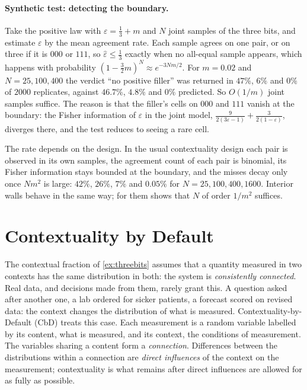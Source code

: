 \documentclass[11pt]{article}
\theoremstyle{definition}
\theoremstyle{remark}
\begin{document}
\paragraph{Synthetic test: detecting the boundary.} Take the positive law with $\varepsilon=\frac13+m$ and $N$ joint samples of the three bits,
and estimate $\varepsilon$ by the mean agreement rate. Each sample agrees on one pair, or on three if it is $000$ or $111$, so $\hat\varepsilon\le\frac13$
exactly when no all-equal sample appears, which happens with probability $(1-\frac32m)^N\approx e^{-3Nm/2}$. For $m=0.02$ and $N=25,100,400$ the
verdict ``no positive filler'' was returned in $47\%$, $6\%$ and $0\%$ of $2000$ replicates, against $46.7\%$, $4.8\%$ and $0\%$ predicted. So
$O(1/m)$ joint samples suffice. The reason is that the filler's cells on $000$ and $111$ vanish at the boundary: the Fisher information of
$\varepsilon$ in the joint model, $\frac9{2(3\varepsilon-1)}+\frac3{2(1-\varepsilon)}$, diverges there, and the test reduces to seeing a rare cell.

The rate depends on the design. In the usual contextuality design each pair is observed in its own samples, the agreement count of each
pair is binomial, its Fisher information stays bounded at the boundary, and the misses decay only once $Nm^2$ is large: $42\%$, $26\%$, $7\%$
and $0.05\%$ for $N=25,100,400,1600$. Interior walls behave in the same way; for them \cite[Prop.~12.2]{Conditionals} shows that $N$ of order
$1/m^2$ suffices.

\section{Contextuality by Default}\label{sec:cbd}

The contextual fraction of \cref{ex:threebits} assumes that a quantity measured in two contexts has the same distribution in both:
the system is \emph{consistently connected}. Real data, and decisions made from them, rarely grant this. A question asked after another
one, a lab ordered for sicker patients, a forecast scored on revised data: the context changes the distribution of what is measured.
Contextuality-by-Default (CbD) \cite{DzhafarovKujala2016} treats this case. Each measurement is a random variable labelled by its content,
what is measured, and its context, the conditions of measurement. The variables sharing a content form a \emph{connection}. Differences between
the distributions within a connection are \emph{direct influences} of the context on the measurement; contextuality is what remains after
direct influences are allowed for as fully as possible.
\end{document}
